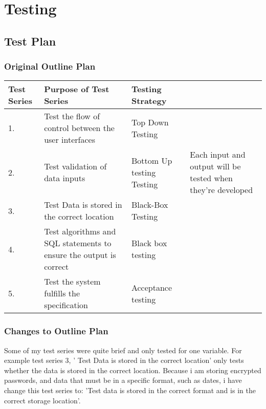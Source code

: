 \chapter{Testing}

\section{Test Plan}

\begin{landscape}
\subsection{Original Outline Plan}

\begin{center}
    \begin{tabular}{|p{2cm}|p{5cm}|p{5cm}|p{4cm}|}
        \hline
        \textbf{Test Series} & \textbf{Purpose of Test Series} & \textbf{Testing Strategy} & \\ \hline
	1. & Test the flow of control between the user interfaces & Top Down Testing &  \\ \hline
	2. & Test validation of data inputs & Bottom Up testing Testing &  Each input and output will be tested when they're developed\\ \hline
	3. & Test Data is stored in the correct location & Black-Box Testing & \\ \hline
	4. & Test algorithms and SQL statements to ensure the output is correct & Black box testing &\\ \hline
	5. & Test the system fulfills the specification & Acceptance testing & \\ \hline

    \end{tabular}
\end{center}

\subsection{Changes to Outline Plan}
	Some of my test series were quite brief and only tested for one variable. For example test series 3, ' Test Data is stored in the correct location' only tests whether the data is stored in the correct location. Because i am storing encrypted passwords, and data that must be in a specific format, such as dates, i have change this test series to: 'Test data is stored in the correct format and is in the correct storage location'. \par


\end{landscape}
